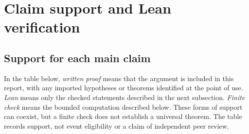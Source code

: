 \documentclass[11pt]{article}
\theoremstyle{definition}\newtheorem{definition}[theorem]{Definition}
\theoremstyle{remark}\newtheorem{remark}[theorem]{Remark}
\begin{document}
\clearpage
\section{Claim support and Lean verification}\label{sec:support}

\subsection{Support for each main claim}
In the table below, \emph{written proof} means that the argument is included in this report, with any imported hypotheses or theorems identified at the point of use. \emph{Lean} means only the checked statements described in the next subsection. \emph{Finite check} means the bounded computation described below. These forms of support can coexist, but a finite check does not establish a universal theorem. The table records support, not event eligibility or a claim of independent peer review.
\end{document}
